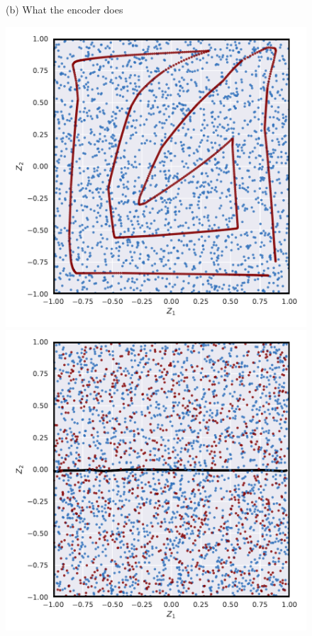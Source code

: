 \documentclass{article}
\begin{document}
\begin{figure}[t!]
\begin{minipage}{.315\textwidth}
	\end{minipage}%
	\begin{minipage}{.315\textwidth}
		\centering
		(b) What the encoder does
		
		\includegraphics[width=\textwidth]{deterministic_manifold_all}

		\includegraphics[width=\textwidth]{random_manifold_all}
		

\end{minipage}
\end{figure}
\end{document}
